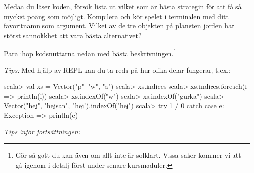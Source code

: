 \Subtask Medan du läser koden, försök lista ut vilket som är bästa strategin för att få så mycket poäng som möjligt. Kompilera och kör spelet i terminalen med ditt favoritnamn som argument. Vilket av de tre objekten på planeten jorden har störst sannolikhet att vara bästa alternativet?

\Subtask Para ihop kodsnuttarna nedan med bästa beskrivningen.\footnote{Gör så gott du kan även om allt inte är solklart. Vissa saker kommer vi att gå igenom i detalj först under senare kursmoduler.}

\begin{ConceptConnections}

\end{ConceptConnections}

\noindent\emph{Tips:} Med hjälp av REPL kan du ta reda på hur olika delar fungerar, t.ex.:

\begin{REPL}
scala> val xs = Vector("p", "w", "a")
scala> xs.indices
scala> xs.indices.foreach(i => println(i))
scala> xs.indexOf("w")
scala> xs.indexOf("gurka")
scala> Vector("hej", "hejsan", "hej").indexOf("hej")
scala> try 1 / 0 catch case e: Exception => println(e)
\end{REPL}


\noindent\emph{Tips inför fortsättningen:}

